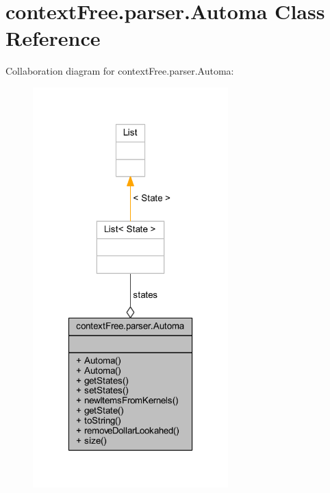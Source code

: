 \hypertarget{classcontext_free_1_1parser_1_1_automa}{\section{context\-Free.\-parser.\-Automa Class Reference}
\label{classcontext_free_1_1parser_1_1_automa}
}


Collaboration diagram for context\-Free.\-parser.\-Automa\-:\nopagebreak
\begin{figure}[H]
\begin{center}
\leavevmode
\includegraphics[width=214pt]{classcontext_free_1_1parser_1_1_automa__coll__graph}
\end{center}
\end{figure}

